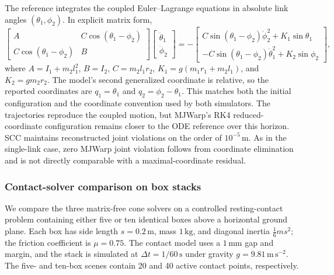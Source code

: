 \documentclass{article}
\theoremstyle{plain}
\theoremstyle{definition}
\begin{document}
The reference integrates the coupled Euler--Lagrange equations in absolute
link angles $(\theta_1,\phi_2)$. In explicit matrix form,
\begin{equation}
\begin{bmatrix}A&C\cos(\theta_1-\phi_2)\\
C\cos(\theta_1-\phi_2)&B\end{bmatrix}
\begin{bmatrix}\ddot\theta_1\\\ddot\phi_2\end{bmatrix}
=-\begin{bmatrix}
C\sin(\theta_1-\phi_2)\dot\phi_2^2+K_1\sin\theta_1\\
-C\sin(\theta_1-\phi_2)\dot\theta_1^2+K_2\sin\phi_2
\end{bmatrix},
\end{equation}
where $A=I_1+m_2l_1^2$, $B=I_2$, $C=m_2l_1r_2$,
$K_1=g(m_1r_1+m_2l_1)$, and $K_2=gm_2r_2$. The model's second generalized
coordinate is relative, so the reported coordinates are
$q_1=\theta_1$ and $q_2=\phi_2-\theta_1$. This matches both the initial
configuration and the coordinate convention used by both simulators. The
trajectories reproduce the coupled motion, but MJWarp's RK4 reduced-coordinate
configuration remains closer to the ODE reference over this horizon. SCC
maintains reconstructed joint violations on the order of $10^{-5}\,\mathrm{m}$.
As in the single-link case, zero MJWarp joint violation follows from coordinate
elimination and is not directly comparable with a maximal-coordinate residual.

\subsubsection{Contact-solver comparison on box stacks}
\label{sec:box-results}

We compare the three matrix-free cone solvers on a controlled resting-contact
problem containing either five or ten identical boxes above a
horizontal ground plane. Each box has side length $s=0.2\,\mathrm{m}$, mass
$1\,\mathrm{kg}$, and diagonal inertia $\frac{1}{6}ms^2$; the friction
coefficient is $\mu=0.75$. The contact model uses a $1\,\mathrm{mm}$ gap and
margin, and the stack is simulated at $\Delta t=1/60\,\mathrm{s}$ under gravity
$g=9.81\,\mathrm{m\,s^{-2}}$. The five- and ten-box scenes contain 20 and 40
active contact points, respectively.
\end{document}
